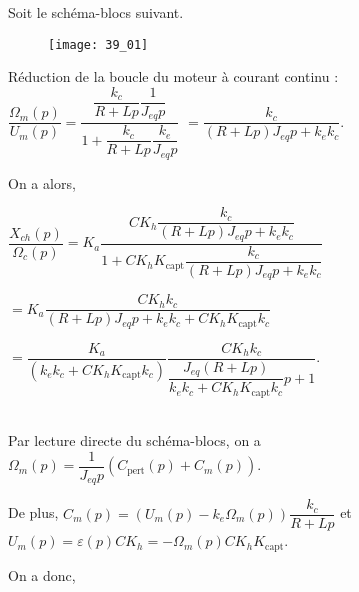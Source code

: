 \normaltrue \difficilefalse \tdifficilefalse
\correctiontrue


\setcounter{question}{0}%
\ifcorrection
\else
{}
\fi

\ifprof
\else
Soit le schéma-blocs suivant. 
\begin{figure}
\texttt{[image: 39\_01]}
\end{figure}
\fi

\ifprof
Réduction de la boucle du moteur à courant continu : 
$\dfrac{\Omega_m(p)}{U_m(p)}=\dfrac{\dfrac{k_c}{R+Lp}\dfrac{1}{J_{eq}p}}{1+\dfrac{k_c}{R+Lp}\dfrac{k_e}{J_{eq}p}}$
$=\dfrac{k_c}{\left(R+Lp\right)J_{eq}p+k_ek_c}$.

On a alors, 

$
\dfrac{X_{ch}(p)}{\Omega_c(p)} =
K_a  \dfrac{CK_h \dfrac{k_c}{\left(R+Lp\right)J_{eq}p+k_ek_c}}{1+CK_hK_{\text{capt}} \dfrac{k_c}{\left(R+Lp\right)J_{eq}p+k_ek_c}}
$ 

$
=
K_a \dfrac{CK_h k_c}{\left(R+Lp\right)J_{eq}p+k_ek_c+CK_hK_{\text{capt}} k_c}
$

$
=
\dfrac{K_a }{\left( k_ek_c+CK_hK_{\text{capt}} k_c\right)} \dfrac{CK_h k_c}{\dfrac{J_{eq}\left(R+Lp\right)}{k_ek_c+CK_hK_{\text{capt}} k_c}p+1}
$.

\else
\fi

\ifprof ~\\
Par lecture directe du schéma-blocs, on a 
$\Omega_m(p) = \dfrac{1}{J_{eq}p}\left(C_{\text{pert}}(p) + C_m(p)\right)$.

De plus, 
$C_m(p) = \left(U_m(p)-k_e\Omega_m(p)\right) \dfrac{k_c}{R+Lp}$
 et $U_m(p)=\varepsilon(p) C K_h = -\Omega_m(p) C K_h K_{\text{capt}}$.
 
 On a donc, 
 
